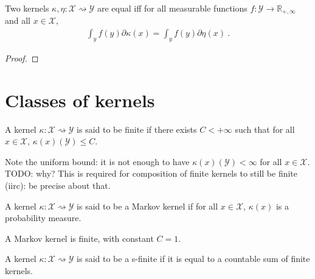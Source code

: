 \begin{theorem}
  \label{thm:kernel_ext}
  \mathlibok
  Two kernels $\kappa, \eta : \mathcal X \rightsquigarrow \mathcal Y$ are equal iff for all measurable functions $f : \mathcal Y \to \mathbb{R}_{+,\infty}$ and all $x \in \mathcal X$,
  \begin{align*}
  \int_y f(y) \partial \kappa(x) = \int_y f(y) \partial \eta(x) \: .
  \end{align*}
\end{theorem}

\begin{proof}\mathlibok
\uses{}

\end{proof}

\section{Classes of kernels}

\begin{definition}
  \label{def:finite_kernel}
  \mathlibok
  A kernel $\kappa : \mathcal X \rightsquigarrow \mathcal Y$ is said to be finite if there exists $C < +\infty$ such that for all $x \in \mathcal X$, $\kappa(x)(\mathcal Y) \le C$.
\end{definition}

Note the uniform bound: it is not enough to have $\kappa(x)(\mathcal Y) < \infty$ for all $x \in \mathcal X$. TODO: why? This is required for composition of finite kernels to still be finite (iirc): be precise about that.

\begin{definition}
  \label{def:markov_kernel}
  \mathlibok
  A kernel $\kappa : \mathcal X \rightsquigarrow \mathcal Y$ is said to be a Markov kernel if for all $x \in \mathcal X$, $\kappa(x)$ is a probability measure.
\end{definition}

A Markov kernel is finite, with constant $C = 1$.

\begin{definition}
  \label{def:sFinite_kernel}
  \mathlibok
  A kernel $\kappa : \mathcal X \rightsquigarrow \mathcal Y$ is said to be a s-finite if it is equal to a countable sum of finite kernels.
\end{definition}

